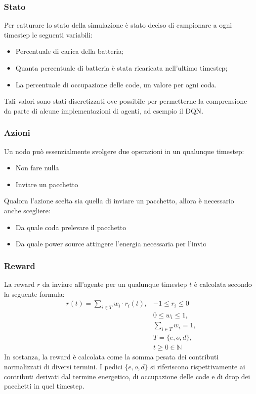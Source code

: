 \documentclass[conference]{IEEEtran}
\begin{document}
\subsubsection{Stato}
Per catturare lo stato della simulazione è stato deciso di campionare a ogni timestep le
seguenti variabili:
\begin{itemize}
    \item Percentuale di carica della batteria;
    \item Quanta percentuale di batteria è stata ricaricata nell'ultimo timestep;
    \item La percentuale di occupazione delle code, un valore per ogni coda. 
\end{itemize}
Tali valori sono stati discretizzati ove possibile per permetterne la comprensione da
parte di alcune implementazioni di agenti, ad esempio il DQN.
\subsubsection{Azioni}
Un nodo può essenzialmente svolgere due operazioni in un qualunque timestep:
\begin{itemize}
    \item Non fare nulla
    \item Inviare un pacchetto
\end{itemize}
Qualora l'azione scelta sia quella di inviare un pacchetto, allora è necessario anche
scegliere:
\begin{itemize}
    \item Da quale coda prelevare il pacchetto
    \item Da quale power source attingere l'energia necessaria per l'invio
\end{itemize}
\subsubsection{Reward}
La reward $r$ da inviare all'agente per un qualunque timestep $t$ è calcolata secondo la
seguente formula:
\begin{equation}
    \label{eq:reward}
    \begin{aligned}
        & r(t) = \sum_{i \in T} w_i \cdot r_i(t), & -1 \leq r_i \leq 0\\
        && 0 \leq w_i \leq 1, \\
        && \sum_{i \in T} w_i = 1, \\
        && T = \{e, o, d\},\\
        && t \geq 0 \in \mathbb{N}
    \end{aligned}
\end{equation}
In sostanza, la reward è calcolata come la somma pesata dei contributi normalizzati di
diversi termini.
I pedici $\{e, o, d\}$ si riferiscono rispettivamente ai contributi derivati dal termine
energetico, di occupazione delle code e di drop dei pacchetti in quel timestep.
\end{document}

